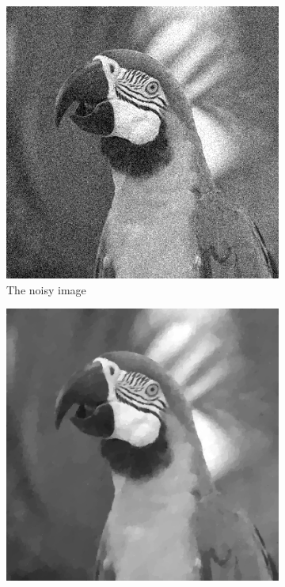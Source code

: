 \documentclass{article}
\begin{document}
\begin{figure}[htbp]
\begin{subfigure}[b]{0.24\textwidth}
        \includegraphics[width=\textwidth]{../images/noisy_gray.png}
        \caption{The noisy image}
        \label{fig:noisy_gray}
    \end{subfigure}
    \hfill
    \begin{subfigure}[b]{0.24\textwidth}
        \centering
        \includegraphics[width=\textwidth]{../images/TVdenoised_gray.png}

\end{subfigure}
\end{figure}
\end{document}
